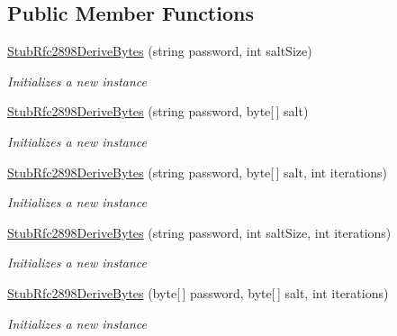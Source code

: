 \subsection*{Public Member Functions}
\begin{DoxyCompactItemize}
\item 
\hyperlink{class_system_1_1_security_1_1_cryptography_1_1_fakes_1_1_stub_rfc2898_derive_bytes_a8539f185c8ce42739e2c753c9494c373}{Stub\-Rfc2898\-Derive\-Bytes} (string password, int salt\-Size)
\begin{DoxyCompactList}\small\item\em Initializes a new instance\end{DoxyCompactList}\item 
\hyperlink{class_system_1_1_security_1_1_cryptography_1_1_fakes_1_1_stub_rfc2898_derive_bytes_af77e362222b95cf3bdf6408bacbb5e0d}{Stub\-Rfc2898\-Derive\-Bytes} (string password, byte\mbox{[}$\,$\mbox{]} salt)
\begin{DoxyCompactList}\small\item\em Initializes a new instance\end{DoxyCompactList}\item 
\hyperlink{class_system_1_1_security_1_1_cryptography_1_1_fakes_1_1_stub_rfc2898_derive_bytes_afb8b3a2c98d44d1f8d90d7c7321970e9}{Stub\-Rfc2898\-Derive\-Bytes} (string password, byte\mbox{[}$\,$\mbox{]} salt, int iterations)
\begin{DoxyCompactList}\small\item\em Initializes a new instance\end{DoxyCompactList}\item 
\hyperlink{class_system_1_1_security_1_1_cryptography_1_1_fakes_1_1_stub_rfc2898_derive_bytes_a3c00e519df14c3ef12ceed8068514aa7}{Stub\-Rfc2898\-Derive\-Bytes} (string password, int salt\-Size, int iterations)
\begin{DoxyCompactList}\small\item\em Initializes a new instance\end{DoxyCompactList}\item 
\hyperlink{class_system_1_1_security_1_1_cryptography_1_1_fakes_1_1_stub_rfc2898_derive_bytes_a48a64d2f2ba69b4362e64fbfacb0e476}{Stub\-Rfc2898\-Derive\-Bytes} (byte\mbox{[}$\,$\mbox{]} password, byte\mbox{[}$\,$\mbox{]} salt, int iterations)
\begin{DoxyCompactList}\small\item\em Initializes a new instance\end{DoxyCompactList}\item 

\end{DoxyCompactItemize}
